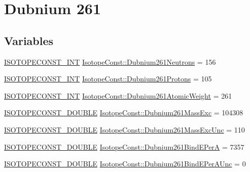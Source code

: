 \hypertarget{group___isotope_const-_dubnium-_db261}{}\section{Dubnium 261}
\label{group___isotope_const-_dubnium-_db261}
\subsection*{Variables}
\begin{DoxyCompactItemize}
\item 
\mbox{\hyperlink{group___isotope_const-_macros_ga5f18360b3e99483a35c32d789e62621c}{I\+S\+O\+T\+O\+P\+E\+C\+O\+N\+S\+T\+\_\+\+I\+NT}} \mbox{\hyperlink{group___isotope_const-_dubnium-_db261_gafbba469057a4b34c00d0b20e4201fa21}{Isotope\+Const\+::\+Dubnium261\+Neutrons}} = 156
\item 
\mbox{\hyperlink{group___isotope_const-_macros_ga5f18360b3e99483a35c32d789e62621c}{I\+S\+O\+T\+O\+P\+E\+C\+O\+N\+S\+T\+\_\+\+I\+NT}} \mbox{\hyperlink{group___isotope_const-_dubnium-_db261_gab82ca52a984afdc73462daf8d19b3681}{Isotope\+Const\+::\+Dubnium261\+Protons}} = 105
\item 
\mbox{\hyperlink{group___isotope_const-_macros_ga5f18360b3e99483a35c32d789e62621c}{I\+S\+O\+T\+O\+P\+E\+C\+O\+N\+S\+T\+\_\+\+I\+NT}} \mbox{\hyperlink{group___isotope_const-_dubnium-_db261_gab54943972be16d9787c72780b598ff8d}{Isotope\+Const\+::\+Dubnium261\+Atomic\+Weight}} = 261
\item 
\mbox{\hyperlink{group___isotope_const-_macros_ga8f45a7272ce02c0b4c65c44636ed719a}{I\+S\+O\+T\+O\+P\+E\+C\+O\+N\+S\+T\+\_\+\+D\+O\+U\+B\+LE}} \mbox{\hyperlink{group___isotope_const-_dubnium-_db261_gaa579d0e4620850385e5494296b2f4133}{Isotope\+Const\+::\+Dubnium261\+Mass\+Exc}} = 104308
\item 
\mbox{\hyperlink{group___isotope_const-_macros_ga8f45a7272ce02c0b4c65c44636ed719a}{I\+S\+O\+T\+O\+P\+E\+C\+O\+N\+S\+T\+\_\+\+D\+O\+U\+B\+LE}} \mbox{\hyperlink{group___isotope_const-_dubnium-_db261_ga8859dd76d47c57b137c469916314fa78}{Isotope\+Const\+::\+Dubnium261\+Mass\+Exc\+Unc}} = 110
\item 
\mbox{\hyperlink{group___isotope_const-_macros_ga8f45a7272ce02c0b4c65c44636ed719a}{I\+S\+O\+T\+O\+P\+E\+C\+O\+N\+S\+T\+\_\+\+D\+O\+U\+B\+LE}} \mbox{\hyperlink{group___isotope_const-_dubnium-_db261_ga73ec8618252cf1ee24a750b760cd3a56}{Isotope\+Const\+::\+Dubnium261\+Bind\+E\+PerA}} = 7357
\item 
\mbox{\hyperlink{group___isotope_const-_macros_ga8f45a7272ce02c0b4c65c44636ed719a}{I\+S\+O\+T\+O\+P\+E\+C\+O\+N\+S\+T\+\_\+\+D\+O\+U\+B\+LE}} \mbox{\hyperlink{group___isotope_const-_dubnium-_db261_ga98ebde9c9440e632393e8fea3906985c}{Isotope\+Const\+::\+Dubnium261\+Bind\+E\+Per\+A\+Unc}} = 0

\end{DoxyCompactItemize}
